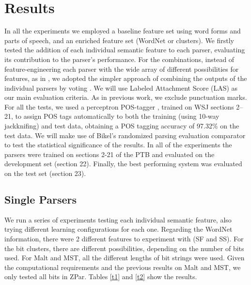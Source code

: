 \documentclass[11pt]{article}
\begin{document}
\section{Results}\label{results}
In all the experiments we employed a baseline feature set using
word forms and parts of speech, and an enriched feature set (WordNet or clusters).
We firstly tested the addition of each individual semantic feature to each parser, evaluating its contribution to the parser's performance. For the combinations, instead of feature-engineering each parser with the wide array of different possibilities for features, as in , we adopted the simpler approach of combining the outputs of the individual parsers by voting \cite{sagae2006}. We will use Labeled Attachment Score (LAS) as our main evaluation criteria. 
As in previous work, we exclude punctuation marks. For all the tests, we used a perceptron POS-tagger \cite{collins:2002:EMNLP02}, trained on WSJ sections 2--21, to assign POS tags automatically to both the training (using 10-way jackknifing) and test data, obtaining a POS tagging accuracy of 97.32\% on the test data. We will make use of Bikel's randomized parsing evaluation comparator to test the statistical signiﬁcance of the results. In all of the experiments the parsers were trained on sections 2-21 of the PTB and evaluated on the development set (section 22). Finally, the best performing system was evaluated on the test set (section 23).



\subsection{Single Parsers}\label{individual}
We run a series of experiments testing each individual semantic feature, also trying different
learning configurations for each one.  Regarding the WordNet information, there were 2 different features to experiment with (SF and SS). For the bit clusters, there are different possibilities, depending on the number of bits used. For Malt and MST, all the different lengths of bit strings were used. Given the computational requirements and the previous results on Malt and MST, we only tested all bits in ZPar.
Tables \ref{t1} and \ref{t2} show the results.
\end{document}

